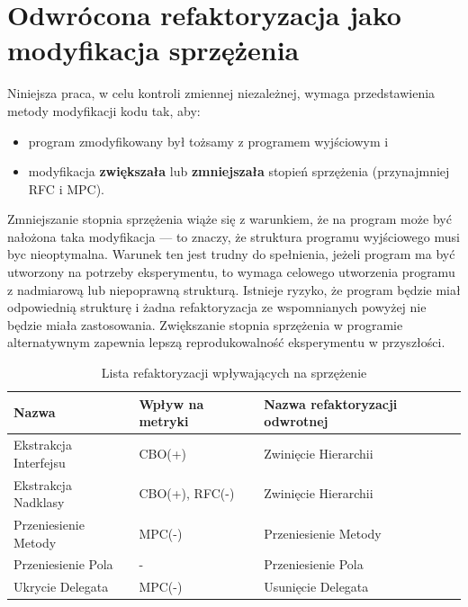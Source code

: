 \section{Odwrócona refaktoryzacja jako modyfikacja sprzężenia}



Niniejsza praca, w celu kontroli zmiennej niezależnej, wymaga przedstawienia metody modyfikacji kodu tak, aby:
\begin{itemize}
    \item program zmodyfikowany był tożsamy z programem wyjściowym i
    \item modyfikacja \textbf{zwiększała} lub \textbf{zmniejszała} stopień sprzężenia (przynajmniej \acrshort{RFC} i
    \acrshort{MPC}).
\end{itemize}

Zmniejszanie stopnia sprzężenia wiąże się z warunkiem, że na program może być nałożona taka modyfikacja --- to znaczy,
że struktura programu wyjściowego musi byc nieoptymalna.
Warunek ten jest trudny do spełnienia, jeżeli program ma być utworzony na potrzeby eksperymentu, to wymaga celowego
utworzenia programu z nadmiarową lub niepoprawną strukturą.
Istnieje ryzyko, że program będzie miał odpowiednią strukturę i żadna refaktoryzacja ze wspomnianych powyżej
nie będzie miała zastosowania.
Zwiększanie stopnia sprzężenia w programie alternatywnym zapewnia lepszą reprodukowalność eksperymentu w przyszłości.

\begin{table}[h]
    \centering
    \begin{tabular}{l|l|l}
        Nazwa & Wpływ na metryki & Nazwa refaktoryzacji odwrotnej \\ \hline\hline
        Ekstrakcja Interfejsu & CBO(+) & Zwinięcie Hierarchii \\ \hline
        Ekstrakcja Nadklasy & CBO(+), RFC(-) & Zwinięcie Hierarchii \\ \hline
        Przeniesienie Metody & MPC(-) & Przeniesienie Metody \\ \hline
        Przeniesienie Pola & - & Przeniesienie Pola \\ \hline
        Ukrycie Delegata & MPC(-) & Usunięcie Delegata
    \end{tabular}
    \caption[Lista refaktoryzacji wpływających na sprzężenie]{\label{tab:refaktoryzacje}Lista refaktoryzacji wpływających na sprzężenie}
\end{table}


